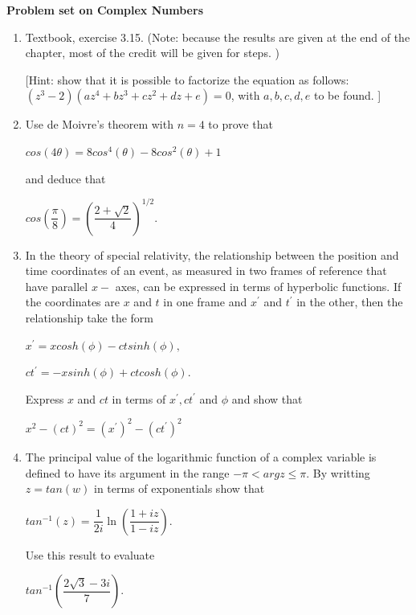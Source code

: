 \documentclass[fleqn]{article}
\begin{document}

\pagebreak


\textbf{Problem set on Complex Numbers}

\begin{enumerate}

  \item  Textbook, exercise 3.15. (Note: because the results are given at the end of the chapter, most of the  credit will be given for steps. ) 
  
  [Hint:  show that it is possible to factorize the equation as follows: $(z^3-2)(a z^4 + b z^3 + c z^2 + d z + e)=0$, with $a,b,c,d,e$ to be found. ]
  
  \item  Use de Moivre’s theorem with $n=4$ to prove that

  $cos(4\theta)=8cos^4(\theta)-8cos^2(\theta)+1$

  and deduce that 

  $cos(\dfrac{\pi}{8})=(\dfrac{2+\sqrt{2}}{4})^{1/2}$.
  
  \item  In the theory of special relativity, the relationship between the position and time coordinates of an event, as measured in two frames of reference that have parallel $x-$ axes, can be expressed in terms of hyperbolic functions. If the coordinates are $x$ and $t$ in one frame and $x^\prime$ and $t^\prime$ in the other, then the relationship take the form
  
  $x^\prime=x cosh(\phi)-ct sinh(\phi),$
  
  $ct^\prime=-xsinh(\phi)+ct cosh(\phi)$.

  Express $x$ and $ct$ in terms of $x^\prime, ct^\prime$ and $\phi$ and show that 

  $x^2-(ct)^2=(x^\prime)^2-(ct^\prime)^2$
  
  \item The principal value of the logarithmic function of a complex variable is defined to have its argument in the range $-\pi < arg z\leq \pi $. By writting $z=tan(w)$ in terms of exponentials show that

  $tan^{-1}(z)=\dfrac{1}{2i} \ln(\dfrac{1+iz}{1-iz})$.

  Use this result to evaluate

  $tan^{-1}(\dfrac{2\sqrt{3}-3i}{7})$.
  
\end{enumerate}

\end{document}
